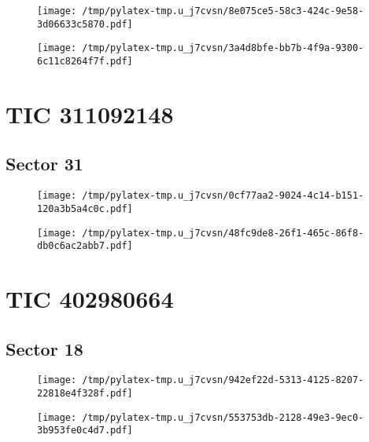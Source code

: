 \documentclass{report}%
\begin{document}
\begin{figure}[H]%
\centering%
\centering%
\texttt{[image: /tmp/pylatex-tmp.u\_j7cvsn/8e075ce5-58c3-424c-9e58-3d06633c5870.pdf]}%
\end{figure}

%


\begin{figure}[H]%
\centering%
\texttt{[image: /tmp/pylatex-tmp.u\_j7cvsn/3a4d8bfe-bb7b-4f9a-9300-6c11c8264f7f.pdf]}%
\end{figure}

%
\section{TIC 311092148}%
\label{sec:TIC311092148}%
\subsection{Sector 31}%
\label{subsec:31109214831}%


\begin{figure}[H]%
\centering%
\centering%
\texttt{[image: /tmp/pylatex-tmp.u\_j7cvsn/0cf77aa2-9024-4c14-b151-120a3b5a4c0c.pdf]}%
\end{figure}

%


\begin{figure}[H]%
\centering%
\texttt{[image: /tmp/pylatex-tmp.u\_j7cvsn/48fc9de8-26f1-465c-86f8-db0c6ac2abb7.pdf]}%
\end{figure}

%
\section{TIC 402980664}%
\label{sec:TIC402980664}%
\subsection{Sector 18}%
\label{subsec:40298066418}%


\begin{figure}[H]%
\centering%
\centering%
\texttt{[image: /tmp/pylatex-tmp.u\_j7cvsn/942ef22d-5313-4125-8207-22818e4f328f.pdf]}%
\end{figure}

%


\begin{figure}[H]%
\centering%
\texttt{[image: /tmp/pylatex-tmp.u\_j7cvsn/553753db-2128-49e3-9ec0-3b953fe0c4d7.pdf]}%
\end{figure}
\end{document}
